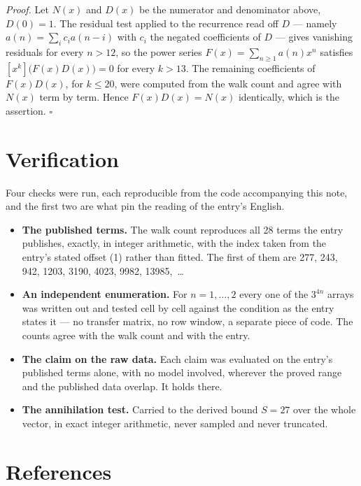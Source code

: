 \documentclass[11pt]{article}
\theoremstyle{definition}
\begin{document}
{\itshape Proof.} Let $N(x)$ and $D(x)$ be the numerator and denominator above, $D(0)=1$. The residual test applied to the recurrence read off $D$ --- namely $a(n) = \sum_i c_i a(n-i)$ with $c_i$ the negated coefficients of $D$ --- gives vanishing residuals for every $n > 12$, so the power series $F(x)=\sum_{n\ge 1}a(n)x^n$ satisfies $[x^k]\bigl(F(x)D(x)\bigr) = 0$ for every $k > 13$. The remaining coefficients of $F(x)D(x)$, for $k \le 20$, were computed from the walk count and agree with $N(x)$ term by term. Hence $F(x)D(x) = N(x)$ identically, which is the assertion. $\square$

\section{Verification}

Four checks were run, each reproducible from the code accompanying this note, and the first two are what pin the reading of the entry's English.

\begin{itemize}

\item {\bfseries The published terms.} The walk count reproduces all 28 terms the entry publishes, exactly, in integer arithmetic, with the index taken from the entry's stated offset (1) rather than fitted. The first of them are 277, 243, 942, 1203, 3190, 4023, 9982, 13985,~\dots

\item {\bfseries An independent enumeration.} For $n = 1,\dots,2$ every one of the $3^{4n}$ arrays was written out and tested cell by cell against the condition as the entry states it --- no transfer matrix, no row window, a separate piece of code. The counts agree with the walk count and with the entry.

\item {\bfseries The claim on the raw data.} Each claim was evaluated on the entry's published terms alone, with no model involved, wherever the proved range and the published data overlap. It holds there.

\item {\bfseries The annihilation test.} Carried to the derived bound $S = 27$ over the whole vector, in exact integer arithmetic, never sampled and never truncated.

\end{itemize}

\section{References}
\end{document}
